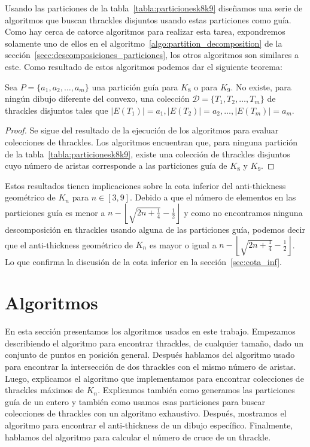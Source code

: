     Usando las particiones de la tabla~\ref{tabla:particionesk8k9} diseñamos
    una serie de algoritmos que buscan thrackles disjuntos usando estas particiones como guía.
    Como hay cerca de catorce algoritmos para realizar esta tarea, expondremos solamente
    uno de ellos en el algoritmo~\ref{algo:partition_decomposition} de la
    sección~\ref{secc:descomposiciones_particiones}, los
    otros algoritmos son similares a este. Como resultado de estos algoritmos podemos dar el
    siguiente teorema:
    \begin{theorem}\label{teorema:particiones}
      Sea $P=\{a_1,a_2,\dots,a_m\}$ una partición guía para $K_8$ o para $K_9$. No existe, para
      ningún dibujo diferente del convexo, una colección $\mathcal{D}=\{T_1,T_2,\dots,T_m\}$ de
      thrackles disjuntos tales que $|E(T_1)|=a_1,|E(T_2)|=a_2,\dots,|E(T_m)|=a_m$.
    \end{theorem}
    \begin{proof}
      Se sigue del resultado de la ejecución de los algoritmos para evaluar colecciones de
      thrackles. Los algoritmos encuentran que, para ninguna partición de la
      tabla~\ref{tabla:particionesk8k9}, existe una colección de thrackles disjuntos cuyo número de
      aristas corresponde a las particiones guía de $K_8$ y $K_9$.
    \end{proof}

    Estos resultados tienen implicaciones sobre la cota inferior del anti-thickness geométrico de $K_n$
    para $n \in [3,9]$. Debido a que el número de elementos en las particiones guía es menor a
    $n - \left\lfloor\sqrt{2n+\frac{1}{4}} - \frac{1}{2}\right\rfloor$ y como no encontramos ninguna
    descomposición en thrackles usando alguna de las particiones guía, podemos decir que el anti-thickness
    geométrico de $K_n$ es mayor o igual a $n - \left\lfloor\sqrt{2n+\frac{1}{4}} -
    \frac{1}{2}\right\rfloor$. Lo que confirma la discusión de la cota inferior en la
    sección~\ref{sec:cota_inf}.


\section{Algoritmos}\label{seccion_algoritmos}
  En esta sección presentamos los algoritmos usados en este trabajo. Empezamos
  describiendo el algoritmo para encontrar thrackles, de cualquier tamaño, dado
  un conjunto de puntos en posición general. Después hablamos del algoritmo
  usado para encontrar la intersección de dos thrackles con el mismo número de
  aristas. Luego, explicamos el algoritmo que implementamos para encontrar colecciones de thrackles
  máximos de $K_n$. Explicamos también como generamos las particiones guía de un entero y también como usamos esas particiones para buscar colecciones de thrackles con un algoritmo exhaustivo. Después, mostramos el algoritmo para encontrar el anti-thickness de un dibujo específico. Finalmente, hablamos del algoritmo para calcular el número de cruce de un thrackle.


